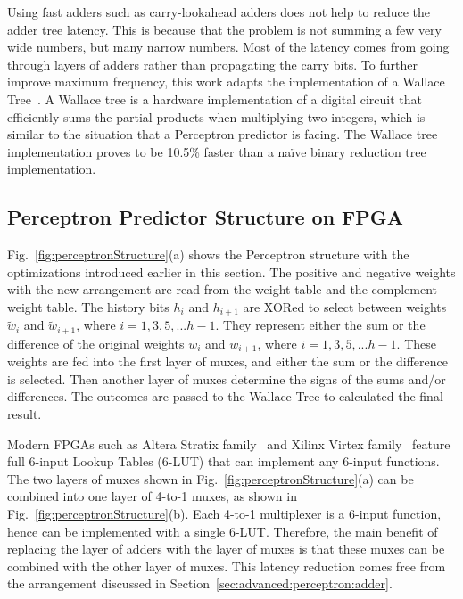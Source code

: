 Using fast adders such as carry-lookahead adders does not help to reduce the adder tree latency. This is because that the problem is not summing a few very wide numbers, but many narrow numbers. Most of the latency comes from going through layers of adders rather than propagating the carry bits. To further improve maximum frequency, this work adapts the implementation of a Wallace Tree~\cite{wallacetree}. A Wallace tree is a hardware implementation of a digital circuit that efficiently sums the partial products when multiplying two integers, which is similar to the situation that a Perceptron predictor is facing. The Wallace tree implementation proves to be 10.5\% faster than a na\"ive binary reduction tree implementation. 

\subsection{Perceptron Predictor Structure on FPGA}
\label{sec:advanced:perceptron:structure}
Fig.~\ref{fig:perceptronStructure}(a) shows the Perceptron structure with the optimizations introduced earlier in this section. The positive and negative weights with the new arrangement are read from the weight table and the complement weight table. The history bits $h_i$ and $h_{i+1}$ are XORed to select between weights $\widetilde{w}_i$ and $\widetilde{w}_{i+1}$, where $i = 1,3,5,...h-1$. They represent either the sum or the difference of the original weights $w_i$ and $w_{i+1}$, where $i = 1,3,5,...h-1$. These weights are fed into the first layer of muxes, and either the sum or the difference is selected. Then another layer of muxes determine the signs of the sums and/or differences. The outcomes are passed to the Wallace Tree to calculated the final result.

Modern FPGAs such as Altera Stratix family~\cite{StratixIV} and Xilinx Virtex family~\cite{virtex} feature full 6-input Lookup Tables (6-LUT) that can implement any 6-input functions. The two layers of muxes shown in Fig.~\ref{fig:perceptronStructure}(a) can be combined into one layer of 4-to-1 muxes, as shown in Fig.~\ref{fig:perceptronStructure}(b). Each 4-to-1 multiplexer is a 6-input function, hence can be implemented with a single 6-LUT. Therefore, the main benefit of replacing the layer of adders with the layer of muxes is that these muxes can be combined with the other layer of muxes. This latency reduction comes free from the arrangement discussed in Section~\ref{sec:advanced:perceptron:adder}.


